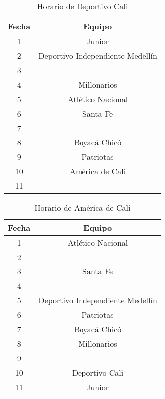 \documentclass[11pt]{article}
\begin{document}
\begin{multicols}{2}
            \begin{table}[H]
                \centering
                \begin{tabular}{|c||c|}
                    \hline
                    Fecha & Equipo\\ \hline
                    1 & Junior \\ \hline
                    2 & Deportivo Independiente Medellín \\ \hline
                    3 &  \\ \hline
                    4 & Millonarios \\ \hline
                    5 & Atlético Nacional \\ \hline
                    6 & Santa Fe \\ \hline
                    7 &  \\ \hline
                    8 & Boyacá Chicó \\ \hline
                    9 & Patriotas\\ \hline
                    10 & América de Cali \\ \hline
                    11 &  \\ \hline
                \end{tabular} 
                \caption{Horario de Deportivo Cali}
            \end{table}

            \begin{table}[H]
                \centering
                \begin{tabular}{|c||c|}
                    \hline
                    Fecha & Equipo\\ \hline
                    1 & Atlético Nacional\\ \hline
                    2 &  \\ \hline
                    3 & Santa Fe \\ \hline
                    4 &  \\ \hline
                    5 & Deportivo Independiente Medellín \\ \hline
                    6 & Patriotas \\ \hline
                    7 & Boyacá Chicó \\ \hline
                    8 & Millonarios\\ \hline
                    9 & \\ \hline
                    10 & Deportivo Cali \\ \hline
                    11 & Junior \\ \hline
                \end{tabular} 
                \caption{Horario de América de Cali}
            \end{table}


\end{multicols}
\end{document}
